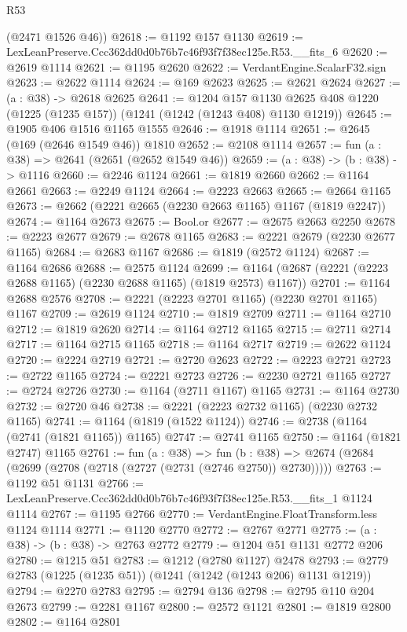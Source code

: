 \begin{lexlean}{R53}
\begin{coremodule}
      (@2471 @1526 @46))
@2618 := @1192 @157 @1130
@2619 := LexLeanPreserve.Ccc362dd0d0b76b7c46f93f7f38ec125e.R53.__fits_6
@2620 := @2619 @1114
@2621 := @1195 @2620
@2622 := VerdantEngine.ScalarF32.sign
@2623 := @2622 @1114
@2624 := @169 @2623
@2625 := @2621 @2624
@2627 := (a : @38) -> @2618 @2625
@2641 := @1204
    @157
    @1130
    @2625
    @408
    @1220
    (@1225 (@1235 @157))
    (@1241 (@1242 (@1243 @408) @1130 @1219))
@2645 := @1905 @406 @1516 @1165 @1555
@2646 := @1918 @1114
@2651 := @2645 (@169 (@2646 @1549 @46)) @1810
@2652 := @2108 @1114
@2657 := fun (a : @38) => @2641 (@2651 (@2652 @1549 @46))
@2659 := (a : @38) -> (b : @38) -> @1116
@2660 := @2246 @1124
@2661 := @1819 @2660
@2662 := @1164 @2661
@2663 := @2249 @1124
@2664 := @2223 @2663
@2665 := @2664 @1165
@2673 := @2662 (@2221 @2665 (@2230 @2663 @1165) @1167 (@1819 @2247))
@2674 := @1164 @2673
@2675 := Bool.or
@2677 := @2675 @2663 @2250
@2678 := @2223 @2677
@2679 := @2678 @1165
@2683 := @2221 @2679 (@2230 @2677 @1165)
@2684 := @2683 @1167
@2686 := @1819 (@2572 @1124)
@2687 := @1164 @2686
@2688 := @2575 @1124
@2699 := @1164 (@2687 (@2221 (@2223 @2688 @1165) (@2230 @2688 @1165) (@1819 @2573) @1167))
@2701 := @1164 @2688 @2576
@2708 := @2221 (@2223 @2701 @1165) (@2230 @2701 @1165) @1167
@2709 := @2619 @1124
@2710 := @1819 @2709
@2711 := @1164 @2710
@2712 := @1819 @2620
@2714 := @1164 @2712 @1165
@2715 := @2711 @2714
@2717 := @1164 @2715 @1165
@2718 := @1164 @2717
@2719 := @2622 @1124
@2720 := @2224 @2719
@2721 := @2720 @2623
@2722 := @2223 @2721
@2723 := @2722 @1165
@2724 := @2221 @2723
@2726 := @2230 @2721 @1165
@2727 := @2724 @2726
@2730 := @1164 (@2711 @1167) @1165
@2731 := @1164 @2730
@2732 := @2720 @46
@2738 := @2221 (@2223 @2732 @1165) (@2230 @2732 @1165)
@2741 := @1164 (@1819 (@1522 @1124))
@2746 := @2738 (@1164 (@2741 (@1821 @1165)) @1165)
@2747 := @2741 @1165
@2750 := @1164 (@1821 @2747) @1165
@2761 := fun (a : @38) =>
  fun (b : @38) => @2674 (@2684 (@2699 (@2708 (@2718 (@2727 (@2731 (@2746 @2750)) @2730)))))
@2763 := @1192 @51 @1131
@2766 := LexLeanPreserve.Ccc362dd0d0b76b7c46f93f7f38ec125e.R53.__fits_1 @1124 @1114
@2767 := @1195 @2766
@2770 := VerdantEngine.FloatTransform.less @1124 @1114
@2771 := @1120 @2770
@2772 := @2767 @2771
@2775 := (a : @38) -> (b : @38) -> @2763 @2772
@2779 := @1204 @51 @1131 @2772 @206
@2780 := @1215 @51
@2783 := @1212 (@2780 @1127) @2478
@2793 := @2779 @2783 (@1225 (@1235 @51)) (@1241 (@1242 (@1243 @206) @1131 @1219))
@2794 := @2270 @2783
@2795 := @2794 @136
@2798 := @2795 @110 @204 @2673
@2799 := @2281 @1167
@2800 := @2572 @1121
@2801 := @1819 @2800
@2802 := @1164 @2801

\end{coremodule}
\end{lexlean}

